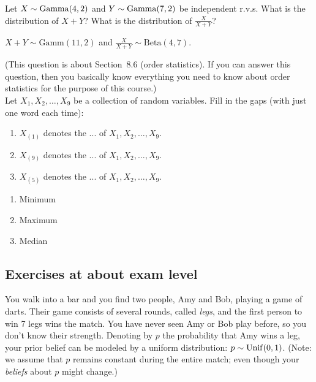 \documentclass[assignments]{subfiles}
\begin{document}
\begin{exercise}
Let $X \sim \mathrm{Gamma}(4,2)$ and $Y \sim \mathrm{Gamma}(7,2)$ be independent r.v.s. What is the distribution of $X+Y$? What is the distribution of $\frac{X}{X+Y}$?

\begin{solution}
$X+Y \sim \text{Gamm}(11,2)$ and $\frac{X}{X+Y} \sim \text{Beta}(4,7)$.
\end{solution}
\end{exercise}





\begin{exercise}
(This question is about Section~8.6 (order statistics). If you can answer this question, then you basically know everything you need to know about order statistics for the purpose of this course.)\\
Let $X_1,X_2,\ldots,X_9$ be a collection of random variables. Fill in the gaps (with just one word each time):
\begin{enumerate}
    \item $X_{(1)}$ denotes the ... of $X_1,X_2,\ldots,X_9$.
    \item $X_{(9)}$ denotes the ... of $X_1,X_2,\ldots,X_9$.
    \item $X_{(5)}$ denotes the ... of $X_1,X_2,\ldots,X_9$.
\end{enumerate}
\begin{solution}
\begin{enumerate}
    \item Minimum
    \item Maximum
    \item Median
\end{enumerate}
\end{solution}
\end{exercise}

\subsection{Exercises at about exam level}
\label{sec:exercises-at-about}


You walk into a bar and you find two people, Amy and Bob, playing a game of darts. Their game consists of several rounds, called \textit{legs}, and the first person to win 7 legs wins the match. You have never seen Amy or Bob play before, so you don't know their strength. Denoting by $p$ the probability that Amy wins a leg, your prior belief can be modeled by a uniform distribution: $p \sim \mathrm{Unif}(0,1)$.  (Note: we assume that $p$ remains constant during the entire match; even though your \textit{beliefs} about $p$ might change.)
\end{document}
